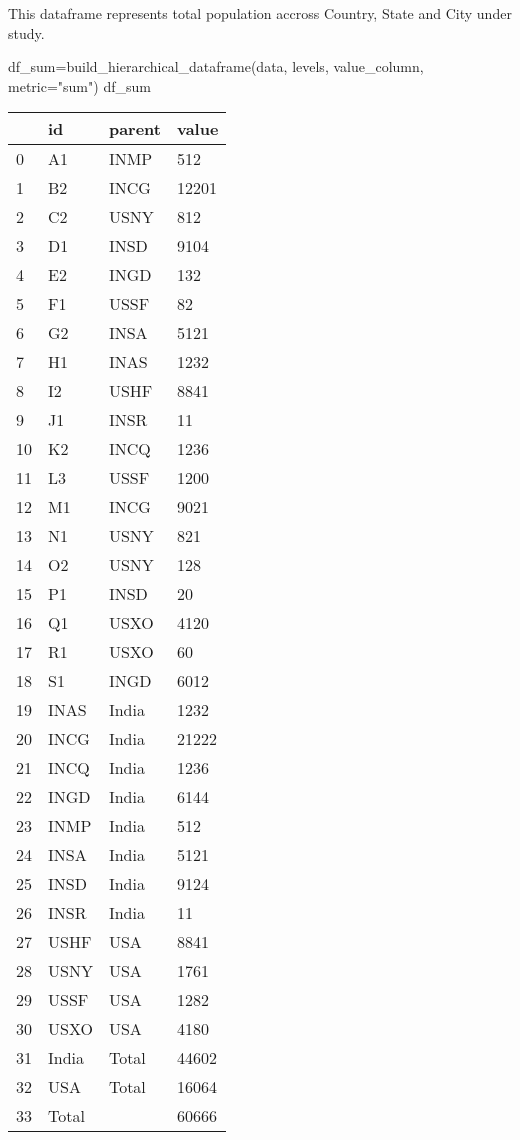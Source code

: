 \documentclass[
  letterpaper,
  DIV=11,
  numbers=noendperiod]{scrartcl}
\newenvironment{Shaded}{\begin{snugshade}}{\end{snugshade}}
\newcommand{\NormalTok}[1]{\textcolor[rgb]{0.00,0.23,0.31}{#1}}
\newcommand{\OperatorTok}[1]{\textcolor[rgb]{0.37,0.37,0.37}{#1}}
\newcommand{\StringTok}[1]{\textcolor[rgb]{0.13,0.47,0.30}{#1}}
\begin{document}
This dataframe represents total population accross Country, State and
City under study.

\begin{Shaded}
\begin{Highlighting}[]
\NormalTok{df\_sum}\OperatorTok{=}\NormalTok{build\_hierarchical\_dataframe(data, levels, value\_column, metric}\OperatorTok{=}\StringTok{"sum"}\NormalTok{)}
\NormalTok{df\_sum}
\end{Highlighting}
\end{Shaded}

\begin{tabular}{llll}
\toprule
{} &     id & parent &  value \\
\midrule
0  &     A1 &   INMP &    512 \\
1  &     B2 &   INCG &  12201 \\
2  &     C2 &   USNY &    812 \\
3  &     D1 &   INSD &   9104 \\
4  &     E2 &   INGD &    132 \\
5  &     F1 &   USSF &     82 \\
6  &     G2 &   INSA &   5121 \\
7  &     H1 &   INAS &   1232 \\
8  &     I2 &   USHF &   8841 \\
9  &     J1 &   INSR &     11 \\
10 &     K2 &   INCQ &   1236 \\
11 &     L3 &   USSF &   1200 \\
12 &     M1 &   INCG &   9021 \\
13 &     N1 &   USNY &    821 \\
14 &     O2 &   USNY &    128 \\
15 &     P1 &   INSD &     20 \\
16 &     Q1 &   USXO &   4120 \\
17 &     R1 &   USXO &     60 \\
18 &     S1 &   INGD &   6012 \\
19 &   INAS &  India &   1232 \\
20 &   INCG &  India &  21222 \\
21 &   INCQ &  India &   1236 \\
22 &   INGD &  India &   6144 \\
23 &   INMP &  India &    512 \\
24 &   INSA &  India &   5121 \\
25 &   INSD &  India &   9124 \\
26 &   INSR &  India &     11 \\
27 &   USHF &    USA &   8841 \\
28 &   USNY &    USA &   1761 \\
29 &   USSF &    USA &   1282 \\
30 &   USXO &    USA &   4180 \\
31 &  India &  Total &  44602 \\
32 &    USA &  Total &  16064 \\
33 &  Total &        &  60666 \\
\bottomrule
\end{tabular}
\end{document}
